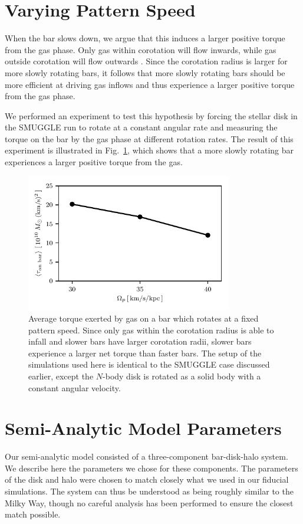 \documentclass[fleqn,usenatbib]{mnras}
\newcommand{\Nbody}{$N$-body}
\begin{document}
\section{Varying Pattern Speed}
\label{app:varyps}
When the bar slows down, we argue that this induces a larger positive torque
from the gas phase. Only gas within corotation will flow inwards, while gas
outside corotation will flow outwards \citep{2011MNRAS.415.1027H}. Since the
corotation radius is larger for more slowly rotating bars, it follows that
more slowly rotating bars should be more efficient at driving gas inflows and
thus experience a larger positive torque from the gas phase.

We performed an experiment to test this hypothesis by forcing the stellar disk
in the SMUGGLE run to rotate at a constant angular rate and measuring the
torque on the bar by the gas phase at different rotation rates. The result of
this experiment is illustrated in Fig.~\ref{fig:equil}, which shows that a more
slowly rotating bar experiences a larger positive torque from the gas.

\begin{figure}
    \centering
    \includegraphics[width=9cm]{fig/torque_ps.pdf}
    \caption{Average torque exerted by gas on a bar which rotates at a fixed
    pattern speed. Since only gas within the corotation radius is able to infall
    and slower bars have larger corotation radii, slower bars experience a
    larger net torque than faster bars. The setup of the simulations used here
    is identical to the SMUGGLE case discussed earlier, except the \Nbody{} disk
    is rotated as a solid body with a constant angular
    velocity.}
    \label{fig:equil}
\end{figure}

\section{Semi-Analytic Model Parameters}
\label{app:sam}
Our semi-analytic model consisted of a three-component bar-disk-halo system. We
describe here the parameters we chose for these components. The parameters of
the disk and halo were chosen to match closely what we used in our fiducial
simulations. The system can thus be understood as being roughly similar to the
Milky Way, though no careful analysis has been performed to ensure the closest
match possible.
\end{document}
